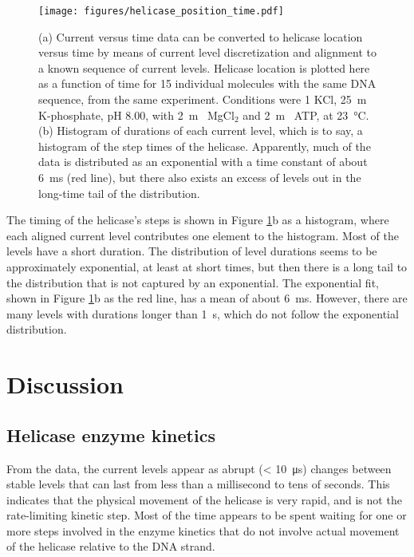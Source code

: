 \begin{figure}[h]
\begin{centering}
\texttt{[image: figures/helicase\_position\_time.pdf]}
\caption[Current levels reveal helicase movement]{(a) Current versus time data can be converted to helicase location versus time by means of current level discretization and alignment to a known sequence of current levels.  Helicase location is plotted here as a function of time for \num{15} individual molecules with the same DNA sequence, from the same experiment.  Conditions were \SI{1}{\Molar} KCl, \SI{25}{\m\Molar} K-phosphate, pH \num{8.00}, with \SI{2}{\m\Molar} MgCl$_2$ and \SI{2}{\m\Molar} ATP, at \SI{23}{\celsius}.  (b) Histogram of durations of each current level, which is to say, a histogram of the step times of the helicase.  Apparently, much of the data is distributed as an exponential with a time constant of about \SI{6}{\ms} (red line), but there also exists an excess of levels out in the long-time tail of the distribution.}
\label{fig:helicase_movement}
\end{centering}
\end{figure}

The timing of the helicase's steps is shown in Figure \ref{fig:helicase_movement}b as a histogram, where each aligned current level contributes one element to the histogram.  Most of the levels have a short duration.  The distribution of level durations seems to be approximately exponential, at least at short times, but then there is a long tail to the distribution that is not captured by an exponential.  The exponential fit, shown in Figure \ref{fig:helicase_movement}b as the red line, has a mean of about \SI{6}{\ms}.  However, there are many levels with durations longer than \SI{1}{\s}, which do not follow the exponential distribution.

\section{Discussion}

\subsection{Helicase enzyme kinetics}

From the data, the current levels appear as abrupt (< \SI{10}{\micro\s}) changes between stable levels that can last from less than a millisecond to tens of seconds.  This indicates that the physical movement of the helicase is very rapid, and is not the rate-limiting kinetic step.  Most of the time appears to be spent waiting for one or more steps involved in the enzyme kinetics that do not involve actual movement of the helicase relative to the DNA strand.

